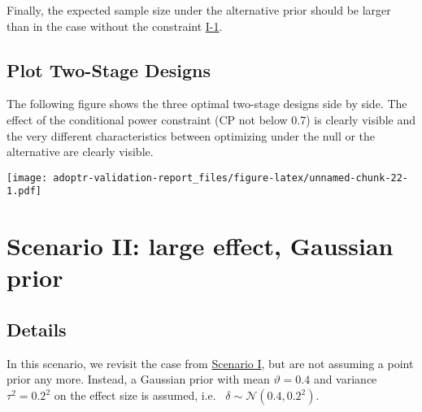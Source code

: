 \documentclass[
]{book}
\newenvironment{Shaded}{\begin{snugshade}}{\end{snugshade}}
\newcommand{\DecValTok}[1]{\textcolor[rgb]{0.00,0.00,0.81}{#1}}
\newcommand{\FunctionTok}[1]{\textcolor[rgb]{0.00,0.00,0.00}{#1}}
\newcommand{\NormalTok}[1]{#1}
\newcommand{\SpecialCharTok}[1]{\textcolor[rgb]{0.00,0.00,0.00}{#1}}
\newcommand{\StringTok}[1]{\textcolor[rgb]{0.31,0.60,0.02}{#1}}
\begin{document}
Finally, the expected sample size under the alternative prior should
be larger than in the case without the constraint \protect\hyperlink{variantI_1}{I-1}.

\begin{Shaded}
\end{Shaded}

\hypertarget{plot-two-stage-designs}{%
\section{Plot Two-Stage Designs}\label{plot-two-stage-designs}}

The following figure shows the three optimal two-stage designs side by
side.
The effect of the conditional power constraint (CP not below 0.7) is
clearly visible and the very different characteristics between
optimizing under the null or the alternative are clearly visible.

\texttt{[image: adoptr-validation-report\_files/figure-latex/unnamed-chunk-22-1.pdf]}

\hypertarget{scenarioII}{%
\chapter{Scenario II: large effect, Gaussian prior}\label{scenarioII}}

\hypertarget{details-1}{%
\section{Details}\label{details-1}}

In this scenario, we revisit the case from \protect\hyperlink{scenarioI}{Scenario I}, but
are not assuming a point prior any more.
Instead, a Gaussian prior with mean \(\vartheta = 0.4\) and
variance \(\tau^2 = 0.2^2\) on the effect size is assumed, i.e.~
\(\delta \sim \mathcal{N} (0.4, 0.2^2)\).
\end{document}
